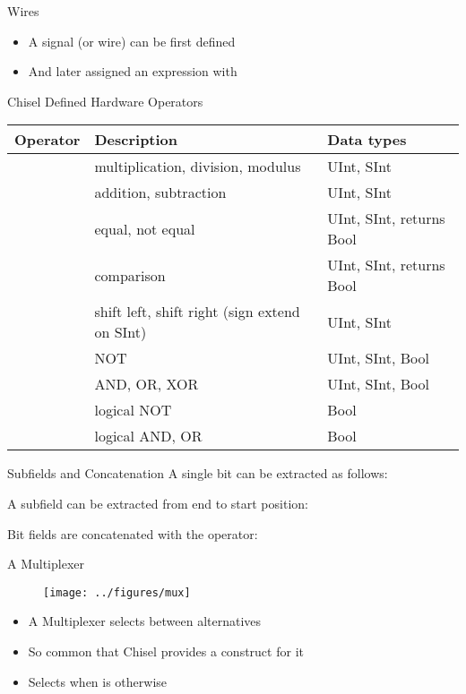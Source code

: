 \begin{frame}[fragile]{Wires}
\begin{itemize}
\item A signal (or wire) can be first defined
\item And later assigned an expression with \code{:=}
\end{itemize}
\end{frame}

\begin{frame}[fragile]{Chisel Defined Hardware Operators}
\begin{table}
{\footnotesize
  \begin{tabular}{lll}
    \toprule
    Operator & Description & Data types \\
    \midrule
    \code{* / \%} & multiplication, division, modulus & UInt, SInt \\
    \code{+ -} & addition, subtraction & UInt, SInt \\
    \code{=== =/=} & equal, not equal & UInt, SInt, returns Bool \\
    \code{> >= < <=} & comparison & UInt, SInt, returns Bool \\
    \code{<< >>} & shift left, shift right (sign extend on SInt) & UInt, SInt \\
    \code{\~} & NOT & UInt, SInt, Bool \\
    \code{\& | \^} & AND, OR, XOR & UInt, SInt, Bool \\
    \code{!} & logical NOT & Bool \\
    \code{\&\& ||} & logical AND, OR & Bool \\
    \bottomrule 
  \end{tabular} 
  }
\end{table}
\end{frame}

\begin{frame}[fragile]{Subfields and Concatenation}
A single bit can be extracted as follows:

\noindent A subfield can be extracted from end to start position:

\noindent Bit fields are concatenated with the \code{\#\#} operator:
\end{frame}


\begin{frame}[fragile]{A Multiplexer}
\begin{figure}
  \texttt{[image: ../figures/mux]}
\end{figure}
\begin{itemize}
\item A Multiplexer selects between alternatives
\item So common that Chisel provides a construct for it
\item Selects  when  is  otherwise 
\end{itemize}
\end{frame}

